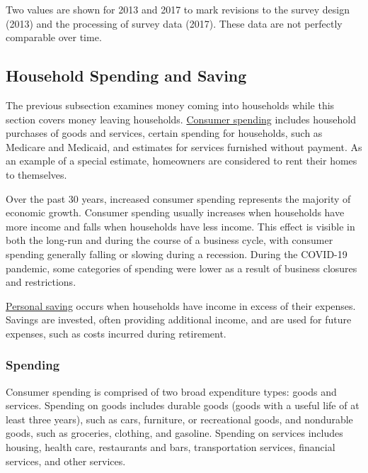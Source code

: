 \documentclass{report}
\begin{document}
{\begin{minipage}{0.35\textwidth}
Two values are shown for 2013 and 2017 to mark revisions to the survey design (2013) and the processing of survey data (2017). These data are not perfectly comparable over time. 
\end{minipage}
\newpage 
\begin{minipage}{0.76\textwidth}
\subsection*{Household Spending and Saving}
\hypertarget{hhss}{}
\small The previous subsection examines money coming into households while this section covers money leaving households. \href{https://www.bea.gov/data/consumer-spending/main}{Consumer spending} includes household purchases of goods and services, certain spending for households, such as Medicare and Medicaid, and estimates for services furnished without payment. As an example of a special estimate, homeowners are considered to rent their homes to themselves. 

Over the past 30 years, increased consumer spending represents the majority of economic growth. Consumer spending usually increases when households have more income and falls when households have less income. This effect is visible in both the long-run and during the course of a business cycle, with consumer spending generally falling or slowing during a recession. During the COVID-19 pandemic, some categories of spending were lower as a result of business closures and restrictions.

\href{https://www.bea.gov/data/income-saving/personal-saving-rate}{Personal saving} occurs when households have income in excess of their expenses. Savings are invested, often providing additional income, and are used for future expenses, such as costs incurred during retirement.

\subsubsection*{Spending}
\small Consumer spending is comprised of two broad expenditure types: goods and services. Spending on goods includes durable goods (goods with a useful life of at least three years), such as cars, furniture, or recreational goods, and nondurable goods, such as groceries, clothing, and gasoline. Spending on services includes housing, health care, restaurants and bars, transportation services, financial services, and other services. 
\end{minipage}
\vspace{2mm}

}
\end{document}
